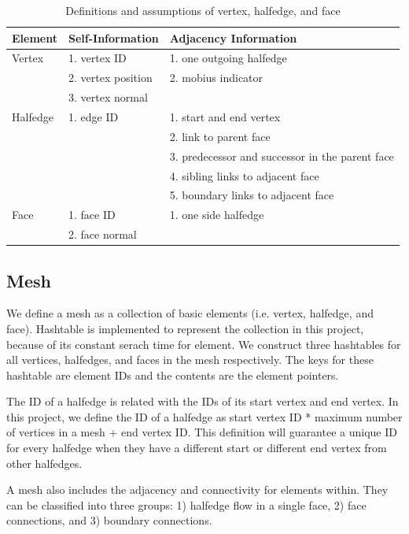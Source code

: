 \documentclass[12pt]{article}
\begin{document}
\begin{table}[ht]
\centering
\begin{tabular}{| l | p{} | p{}|}

\hline
Element & Self-Information & Adjacency Information  \\
\hline
Vertex  & 1. vertex ID & 1. one outgoing halfedge   \\
& 2. vertex position & 2. mobius indicator \\
& 3. vertex normal & \\
\hline
Halfedge & 1. edge ID & 1. start and end vertex\\
& & 2. link to parent face\\
& & 3. predecessor and successor in the parent face\\
& & 4. sibling links to adjacent face\\
& & 5. boundary links to adjacent face \\
\hline
Face    &  1. face ID & 1. one side halfedge\\
& 2. face normal &\\
\hline
\end{tabular}
\caption{Definitions and assumptions of vertex, halfedge, and face} 
\label{table:vhfInfo}
\end{table}

\subsection{Mesh}
We define a mesh as a collection of basic elements (i.e. vertex, halfedge, and face). Hashtable is implemented to represent the collection in this project, because of its constant serach time for element. We construct three hashtables for all vertices, halfedges, and faces in the mesh respectively. The keys for these hashtable are element IDs and the contents are the element pointers.

The ID of a halfedge is related with the IDs of its start vertex and end vertex. In this project, we define the ID of a halfedge as start vertex ID * maximum number of vertices in a mesh + end vertex ID. This definition will guarantee a unique ID for every halfedge when they have a different start or different end vertex from other halfedges. 

A mesh also includes the adjacency and connectivity for elements within. They can be classified into three groups: 1) halfedge flow in a single face, 2) face connections, and 3) boundary connections.
\end{document}
